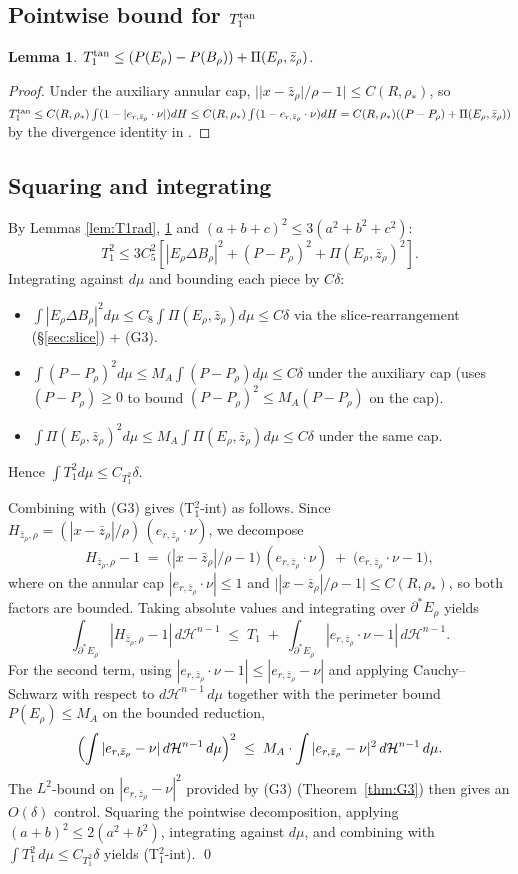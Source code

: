 \documentclass[11pt]{article}
\newtheorem{lemma}[theorem]{Lemma}
\theoremstyle{definition}
\newcommand{\rstar}{\rho_{*}}
\newcommand{\zbar}{\bar z_{\rho}}
\newcommand{\er}{e_{r,\zbar}}
\newcommand{\PiE}{\Pi(E_{\rho},\zbar)}
\begin{document}
\subsection{Pointwise bound for $T_1^{\rm tan}$}

\begin{lemma}\label{lem:T1tan}
$T_1^{\rm tan}\le (P(E_\rho)-P(B_\rho))+\PiE$.
\end{lemma}

\begin{proof}
Under the auxiliary annular cap, $||x-\zbar|/\rho-1|\le C(R,\rstar)$, so
$T_1^{\rm tan}\le C(R,\rstar)\int(1-|\er\cdot\nu|)dH\le C(R,\rstar)\int(1-\er\cdot\nu)dH=C(R,\rstar)((P-P_\rho)+\PiE)$
by the divergence identity in \cite{LevelSetIdentity}.
\end{proof}

\subsection{Squaring and integrating}

By Lemmas \ref{lem:T1rad}, \ref{lem:T1tan} and $(a+b+c)^2\le 3(a^2+b^2+c^2)$:
\[
   T_1^2 \le 3C_5^2[|E_\rho\Delta B_\rho|^2+(P-P_\rho)^2+\PiE^2].
\]
Integrating against $d\mu$ and bounding each piece by $C\delta$:
\begin{itemize}
\item $\int|E_\rho\Delta B_\rho|^2 d\mu\le C_8\int\PiE d\mu\le C\delta$
via the slice-rearrangement (§\ref{sec:slice}) + (G3).
\item $\int(P-P_\rho)^2 d\mu\le M_A\int(P-P_\rho)d\mu\le C\delta$
under the auxiliary cap (uses $(P-P_\rho)\ge 0$ to bound
$(P-P_\rho)^2\le M_A(P-P_\rho)$ on the cap).
\item $\int\PiE^2 d\mu\le M_A\int\PiE d\mu\le C\delta$ under the same cap.
\end{itemize}
Hence $\int T_1^2 d\mu\le C_{T_1^2}\delta$.

Combining with (G3) gives (T$_1^2$-int) as follows. Since
$H_{\zbar,\rho} = (|x-\zbar|/\rho)\,(\er\cdot\nu)$, we decompose
\[
   H_{\zbar,\rho} - 1 \;=\; \bigl(|x-\zbar|/\rho - 1\bigr)\,(\er\cdot\nu)
                       \;+\; \bigl(\er\cdot\nu - 1\bigr),
\]
where on the annular cap $|\er\cdot\nu|\le 1$ and
$\bigl||x-\zbar|/\rho-1\bigr|\le C(R,\rstar)$, so both factors are
bounded. Taking absolute values and integrating over $\partial^*E_\rho$
yields
\[
   \int_{\partial^*E_\rho}|H_{\zbar,\rho}-1|\,d\mathcal H^{n-1}
   \;\le\; T_1
   \;+\; \int_{\partial^*E_\rho}|\er\cdot\nu-1|\,d\mathcal H^{n-1}.
\]
For the second term, using $|\er\cdot\nu-1|\le|\er-\nu|$ and applying
Cauchy--Schwarz with respect to $d\mathcal H^{n-1}\,d\mu$ together with
the perimeter bound $P(E_\rho)\le M_A$ on the bounded reduction,
\[
   \Bigl(\int|\er-\nu|\,d\mathcal H^{n-1}\,d\mu\Bigr)^2
   \;\le\; M_A\cdot\int|\er-\nu|^2\,d\mathcal H^{n-1}\,d\mu.
\]
The $L^2$-bound on $|\er-\nu|^2$ provided by (G3) (Theorem~\ref{thm:G3})
then gives an $O(\delta)$ control. Squaring the pointwise decomposition,
applying $(a+b)^2\le 2(a^2+b^2)$, integrating against $d\mu$, and
combining with $\int T_1^2\,d\mu\le C_{T_1^2}\delta$ yields
(T$_1^2$-int). \hfill\qed
\end{document}
